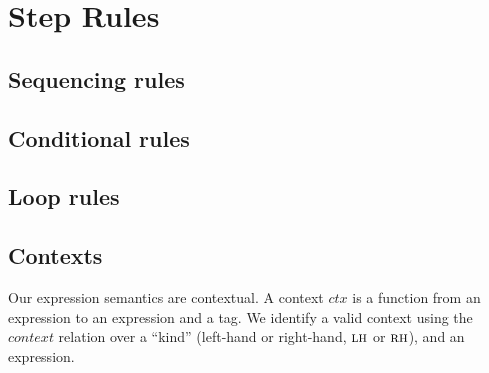 \documentclass[acmsmall,review,anonymous]{acmart}\settopmatter{printfolios=true,printccs=false,printacmref=false}
\begin{document}
\section{Step Rules}
\label{app:rules}

\subsection{Sequencing rules}

\sequencing

\subsection{Conditional rules}

\conditionals

\subsection{Loop rules}

\loops

\subsection{Contexts}
\label{app:contexts}

Our expression semantics are contextual. A context \(\mathit{ctx}\) is a function from an
expression to an expression and a tag. We identify a valid context using the \(\mathit{context}\)
relation over a ``kind'' (left-hand or right-hand, \(\textnormal{\sc lh}\) or \(\textnormal{\sc rh}\)),
and an expression.
\end{document}

